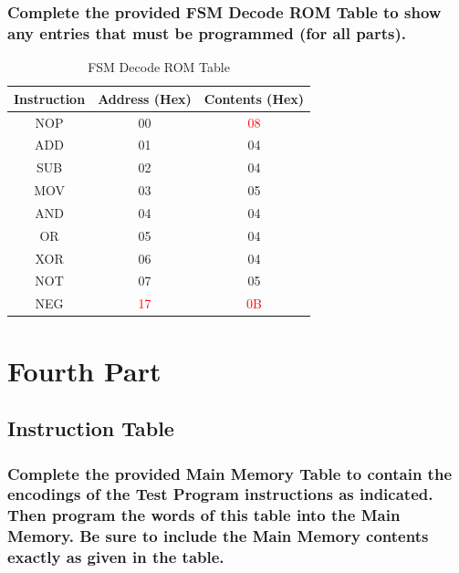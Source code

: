 \documentclass{article}
\begin{document}
	\subsubsection{Complete the provided FSM Decode ROM Table to show any entries that must be programmed (for all parts).}
	\begin{table}[!ht]
		\centering
		\caption{FSM Decode ROM Table}
		\vspace{0.2cm}
		\begin{tabular}{|c|c|c|}
			\hline
			Instruction & Address (Hex) & Contents (Hex)\\
			\hline\hline
			NOP & 00 & \textcolor{red}{08}\\
			\hline
			ADD & 01 & 04\\
			\hline
			SUB & 02 & 04\\
			\hline
			MOV & 03 & 05\\
			\hline
			AND & 04 & 04\\
			\hline
			OR & 05 & 04\\
			\hline
			XOR & 06 & 04\\
			\hline
			NOT & 07 & 05\\
			\hline
			NEG & \textcolor{red}{17} & \textcolor{red}{0B}\\
			\hline
		\end{tabular}
	\end{table}

	\section{Fourth Part}
	\subsection{Instruction Table}
	\subsubsection{Complete the provided Main Memory Table to contain the encodings of the Test Program instructions as indicated. Then program the words of this table into the Main Memory. Be sure to include the Main Memory contents exactly as given in the table.}
	
\end{document}
